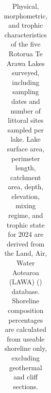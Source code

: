 \documentclass[
  letterpaper,
  DIV=11,
  numbers=noendperiod]{scrartcl}
\begin{document}
\begin{landscape}
\begingroup\fontsize{8}{10}\selectfont

\begin{longtable}[t]{>{\raggedright\arraybackslash}p{2.2cm}>{\raggedright\arraybackslash}p{1.8cm}>{\raggedleft\arraybackslash}p{0.9cm}>{\raggedleft\arraybackslash}p{0.9cm}>{\raggedleft\arraybackslash}p{0.9cm}>{\raggedleft\arraybackslash}p{0.9cm}>{\raggedleft\arraybackslash}p{0.9cm}>{\raggedleft\arraybackslash}p{0.9cm}>{\raggedright\arraybackslash}p{1.5cm}>{\raggedright\arraybackslash}p{1.5cm}>{\raggedleft\arraybackslash}p{0.9cm}>{\raggedleft\arraybackslash}p{0.9cm}>{\raggedleft\arraybackslash}p{0.9cm}>{\raggedleft\arraybackslash}p{0.9cm}}

\caption{\label{tbl-lake-overview}Physical, morphometric, and trophic
characteristics of the five Rotorua Te Arawa Lakes surveyed, including
sampling dates and number of littoral sites sampled per lake. Lake
surface area, perimeter length, catchment area, depth, elevation, mixing
regime, and trophic state for 2024 are derived from the Land, Air, Water
Aotearoa (LAWA) () database. Shoreline
composition percentages are calculated from useable shoreline only,
excluding geothermal and cliff sections.}

\tabularnewline


\end{longtable}
\end{landscape}
\end{document}
